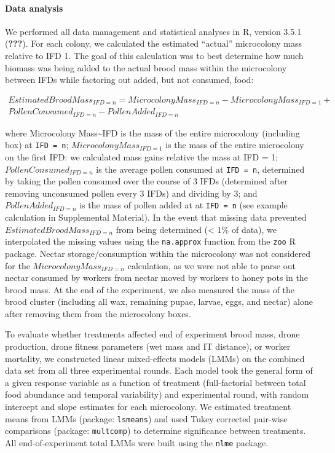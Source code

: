 \documentclass[11pt,]{article}
\let\oldparagraph\paragraph
\renewcommand{\paragraph}[1]{\oldparagraph{#1}\mbox{}}
\begin{document}
\hypertarget{data-analysis}{%
\paragraph{Data analysis}\label{data-analysis}}

We performed all data management and statistical analyses in R, version
3.5.1 ({\textbf{???}}). For each colony, we calculated the estimated
``actual'' microcolony mass relative to IFD 1. The goal of this
calculation was to best determine how much biomass was being added to
the actual brood mass within the microcolony between IFDs while
factoring out added, but not consumed, food:

\[
\begin{aligned}
Estimated Brood Mass_{IFD = n} = Microcolony Mass_{IFD = n} - Microcolony Mass_{IFD = 1} + \\
Pollen Consumed_{IFD = n} - Pollen Added_{IFD = n}
\end{aligned}
\]

where Microcolony Mass\textasciitilde{}IFD is the mass of the entire
microcolony (including box) at \texttt{IFD\ =\ n};
\(Microcolony Mass_{IFD = 1}\) is the mass of the entire microcolony on
the first IFD: we calculated mass gains relative the mass at IFD = 1;
\(Pollen Consumed_{IFD = n}\) is the average pollen consumed at
\texttt{IFD\ =\ n}, determined by taking the pollen consumed over the
course of 3 IFDs (determined after removing unconsumed pollen every 3
IFDs) and dividing by 3; and \(Pollen Added_{IFD = n}\) is the mass of
pollen added at at \texttt{IFD\ =\ n} (see example calculation in
Supplemental Material). In the event that missing data prevented
\(Estimated Brood Mass_{IFD = n}\) from being determined (\textless{}
1\% of data), we interpolated the missing values using the
\texttt{na.approx} function from the \texttt{zoo} R package. Nectar
storage/consumption within the microcolony was not considered for the
\(Microcolony Mass_{IFD = n}\) calculation, as we were not able to parse
out nectar consumed by workers from nectar moved by workers to honey
pots in the brood mass. At the end of the experiment, we also measured
the mass of the brood cluster (including all wax, remaining pupae,
larvae, eggs, and nectar) alone after removing them from the microcolony
boxes.

To evaluate whether treatments affected end of experiment brood mass,
drone production, drone fitness parameters (wet mass and IT distance),
or worker mortality, we constructed linear mixed-effects models (LMMs)
on the combined data set from all three experimental rounds. Each model
took the general form of a given response variable as a function of
treatment (full-factorial between total food abundance and temporal
variability) and experimental round, with random intercept and slope
estimates for each microcolony. We estimated treatment means from LMMs
(package: \texttt{lsmeans}) and used Tukey corrected pair-wise
comparisons (package: \texttt{multcomp}) to determine significance
between treatments. All end-of-experiment total LMMs were built using
the \texttt{nlme} package.
\end{document}
